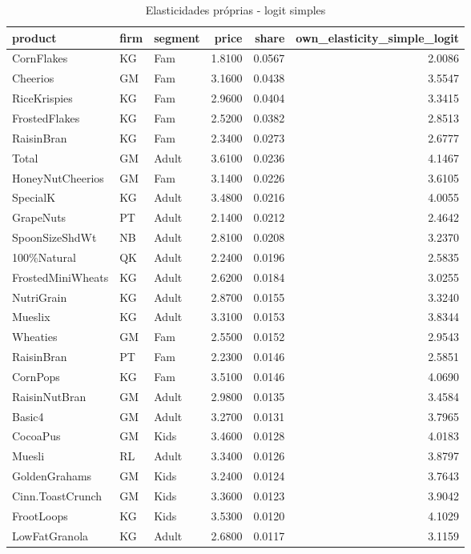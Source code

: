 \begin{table}[!htbp]
\centering
\caption{Elasticidades próprias - logit simples}
\label{tab:own-elas-simple}
\small
\begin{tabular}{lllrrr}
\toprule
product & firm & segment & price & share & own_elasticity_simple_logit \\
\midrule
CornFlakes & KG & Fam & 1.8100 & 0.0567 & 2.0086 \\
Cheerios & GM & Fam & 3.1600 & 0.0438 & 3.5547 \\
RiceKrispies & KG & Fam & 2.9600 & 0.0404 & 3.3415 \\
FrostedFlakes & KG & Fam & 2.5200 & 0.0382 & 2.8513 \\
RaisinBran & KG & Fam & 2.3400 & 0.0273 & 2.6777 \\
Total & GM & Adult & 3.6100 & 0.0236 & 4.1467 \\
HoneyNutCheerios & GM & Fam & 3.1400 & 0.0226 & 3.6105 \\
SpecialK & KG & Adult & 3.4800 & 0.0216 & 4.0055 \\
GrapeNuts & PT & Adult & 2.1400 & 0.0212 & 2.4642 \\
SpoonSizeShdWt & NB & Adult & 2.8100 & 0.0208 & 3.2370 \\
100\%Natural & QK & Adult & 2.2400 & 0.0196 & 2.5835 \\
FrostedMiniWheats & KG & Adult & 2.6200 & 0.0184 & 3.0255 \\
NutriGrain & KG & Adult & 2.8700 & 0.0155 & 3.3240 \\
Mueslix & KG & Adult & 3.3100 & 0.0153 & 3.8344 \\
Wheaties & GM & Fam & 2.5500 & 0.0152 & 2.9543 \\
RaisinBran & PT & Fam & 2.2300 & 0.0146 & 2.5851 \\
CornPops & KG & Fam & 3.5100 & 0.0146 & 4.0690 \\
RaisinNutBran & GM & Adult & 2.9800 & 0.0135 & 3.4584 \\
Basic4 & GM & Adult & 3.2700 & 0.0131 & 3.7965 \\
CocoaPus & GM & Kids & 3.4600 & 0.0128 & 4.0183 \\
Muesli & RL & Adult & 3.3400 & 0.0126 & 3.8797 \\
GoldenGrahams & GM & Kids & 3.2400 & 0.0124 & 3.7643 \\
Cinn.ToastCrunch & GM & Kids & 3.3600 & 0.0123 & 3.9042 \\
FrootLoops & KG & Kids & 3.5300 & 0.0120 & 4.1029 \\
LowFatGranola & KG & Adult & 2.6800 & 0.0117 & 3.1159 \\

\end{tabular}
\end{table}
